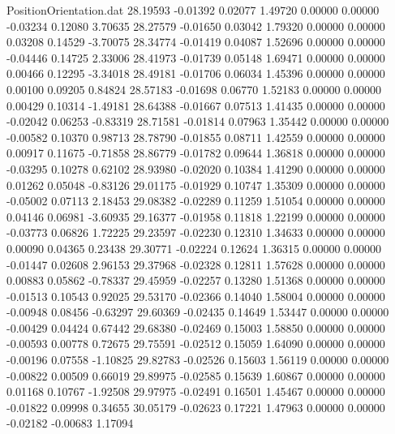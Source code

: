 \begin{filecontents}{PositionOrientation.dat}
  28.19593   -0.01392    0.02077     1.49720    0.00000    0.00000   -0.03234    0.12080    3.70635
  28.27579   -0.01650    0.03042     1.79320    0.00000    0.00000    0.03208    0.14529   -3.70075
  28.34774   -0.01419    0.04087     1.52696    0.00000    0.00000   -0.04446    0.14725    2.33006
  28.41973   -0.01739    0.05148     1.69471    0.00000    0.00000    0.00466    0.12295   -3.34018
  28.49181   -0.01706    0.06034     1.45396    0.00000    0.00000    0.00100    0.09205    0.84824
  28.57183   -0.01698    0.06770     1.52183    0.00000    0.00000    0.00429    0.10314   -1.49181
  28.64388   -0.01667    0.07513     1.41435    0.00000    0.00000   -0.02042    0.06253   -0.83319
  28.71581   -0.01814    0.07963     1.35442    0.00000    0.00000   -0.00582    0.10370    0.98713
  28.78790   -0.01855    0.08711     1.42559    0.00000    0.00000    0.00917    0.11675   -0.71858
  28.86779   -0.01782    0.09644     1.36818    0.00000    0.00000   -0.03295    0.10278    0.62102
  28.93980   -0.02020    0.10384     1.41290    0.00000    0.00000    0.01262    0.05048   -0.83126
  29.01175   -0.01929    0.10747     1.35309    0.00000    0.00000   -0.05002    0.07113    2.18453
  29.08382   -0.02289    0.11259     1.51054    0.00000    0.00000    0.04146    0.06981   -3.60935
  29.16377   -0.01958    0.11818     1.22199    0.00000    0.00000   -0.03773    0.06826    1.72225
  29.23597   -0.02230    0.12310     1.34633    0.00000    0.00000    0.00090    0.04365    0.23438
  29.30771   -0.02224    0.12624     1.36315    0.00000    0.00000   -0.01447    0.02608    2.96153
  29.37968   -0.02328    0.12811     1.57628    0.00000    0.00000    0.00883    0.05862   -0.78337
  29.45959   -0.02257    0.13280     1.51368    0.00000    0.00000   -0.01513    0.10543    0.92025
  29.53170   -0.02366    0.14040     1.58004    0.00000    0.00000   -0.00948    0.08456   -0.63297
  29.60369   -0.02435    0.14649     1.53447    0.00000    0.00000   -0.00429    0.04424    0.67442
  29.68380   -0.02469    0.15003     1.58850    0.00000    0.00000   -0.00593    0.00778    0.72675
  29.75591   -0.02512    0.15059     1.64090    0.00000    0.00000   -0.00196    0.07558   -1.10825
  29.82783   -0.02526    0.15603     1.56119    0.00000    0.00000   -0.00822    0.00509    0.66019
  29.89975   -0.02585    0.15639     1.60867    0.00000    0.00000    0.01168    0.10767   -1.92508
  29.97975   -0.02491    0.16501     1.45467    0.00000    0.00000   -0.01822    0.09998    0.34655
  30.05179   -0.02623    0.17221     1.47963    0.00000    0.00000   -0.02182   -0.00683    1.17094

\end{filecontents}
